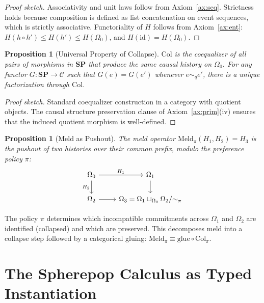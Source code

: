 \documentclass[12pt, a4paper]{article}
\newtheorem{proposition}[theorem]{Proposition}
\theoremstyle{definition}
\theoremstyle{remark}
\newcommand{\Ent}{H}
\newcommand{\SP}{\mathbf{SP}}
\newcommand{\catC}{\mathcal{C}}
\newcommand{\Collapse}{\mathrm{Col}}
\newcommand{\Meld}{\mathrm{Meld}}
\newcommand{\id}{\mathrm{id}}
\begin{document}
\begin{proof}[Proof sketch]
Associativity and unit laws follow from Axiom~\ref{ax:seq}. Strictness holds because
composition is defined as list concatenation on event sequences, which is strictly
associative. Functoriality of $\Ent$ follows from Axiom~\ref{ax:ent}:
$\Ent(h \circ h') \le \Ent(h') \le \Ent(\Omega_0)$, and $\Ent(\id) = \Ent(\Omega_0)$.
\end{proof}

\begin{proposition}[Universal Property of Collapse]
\label{prop:collapse-universal}
$\Collapse$ is the coequalizer of all pairs of morphisms in $\SP$ that produce the same
causal history on $\Omega_0$. For any functor $G : \SP \to \catC$ such that
$G(e) = G(e')$ whenever $e \sim_q e'$, there is a unique factorization through
$\Collapse$.
\end{proposition}

\begin{proof}[Proof sketch]
Standard coequalizer construction in a category with quotient objects. The causal
structure preservation clause of Axiom~\ref{ax:prim}(iv) ensures that the induced
quotient morphism is well-defined.
\end{proof}

\begin{proposition}[Meld as Pushout]
\label{prop:meld}
The \emph{meld} operator $\Meld_\pi(H_1, H_2) = H_3$ is the pushout of two histories over their common prefix, modulo
the preference policy $\pi$:
\[
\begin{tikzcd}
  \Omega_0 \arrow[r, "H_1"] \arrow[d, "H_2"'] & \Omega_1 \arrow[d] \\
  \Omega_2 \arrow[r] & \Omega_3 = \Omega_1 \sqcup_{\Omega_0} \Omega_2 / {\sim_\pi}
\end{tikzcd}
\]
\end{proposition}

The policy $\pi$ determines which incompatible commitments across $\Omega_1$ and
$\Omega_2$ are identified (collapsed) and which are preserved. This decomposes meld
into a collapse step followed by a categorical gluing:
$\Meld_\pi \equiv \text{glue} \circ \Collapse_\pi$.

\section{The Spherepop Calculus as Typed Instantiation}
\label{sec:spc}
\end{document}
